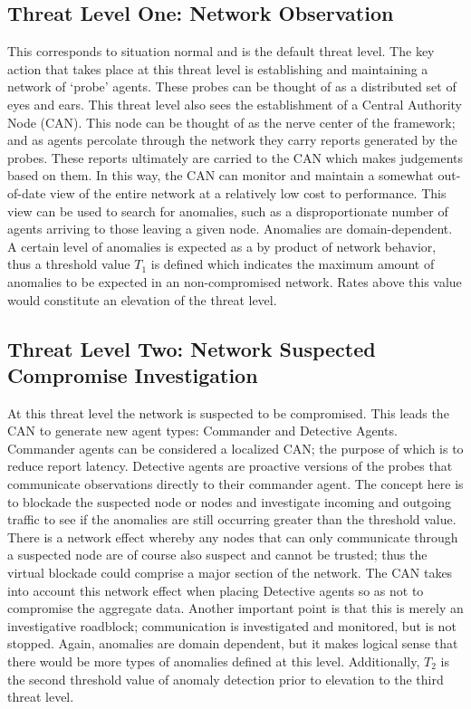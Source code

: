\documentclass{acm_proc_article-sp}
\begin{document}
\subsection{Threat Level One: Network Observation}
This corresponds to situation normal and is the default threat level.  The key action that takes place at this threat level is establishing and maintaining a network of ‘probe’ agents.  These probes can be thought of as a distributed set of eyes and ears.  This threat level also sees the establishment of a Central Authority Node (CAN).  This node can be thought of as the nerve center of the framework; and as agents percolate through the network they carry reports generated by the probes.  These reports ultimately are carried to the CAN which makes judgements based on them.  In this way, the CAN can monitor and maintain a somewhat out-of-date view of the entire network at a relatively low cost to performance.  This view can be used to search for anomalies, such as a disproportionate number of agents arriving to those leaving a given node.  Anomalies are domain-dependent.  A certain level of anomalies is expected as a by product of network behavior, thus a threshold value $T_1$ is defined which indicates the maximum amount of anomalies to be expected in an non-compromised network.  Rates above this value would constitute an elevation of the threat level.

\subsection{Threat Level Two: Network Suspected Compromise Investigation}
At this threat level the network is suspected to be compromised.  This leads the CAN to generate new agent types:  Commander and Detective Agents.  Commander agents can be considered a localized CAN; the purpose of which is to reduce report latency.  Detective agents are proactive versions of the probes that communicate observations directly to their commander agent.  The concept here is to blockade the suspected node or nodes and investigate incoming and outgoing traffic to see if the anomalies are still occurring greater than the threshold value.   There is a network effect whereby any nodes that can only communicate through a suspected node are of course also suspect and cannot be trusted; thus the virtual blockade could comprise a major section of the network.  The CAN takes into account this network effect when placing Detective agents so as not to compromise the aggregate data.  Another important point is that this is merely an investigative roadblock; communication is investigated and monitored, but is not stopped.  Again, anomalies are domain dependent, but it makes logical sense that there would be more types of anomalies defined at this level.  Additionally, $T_2$ is the second threshold value of anomaly detection prior to elevation to the third threat level.
\end{document}
